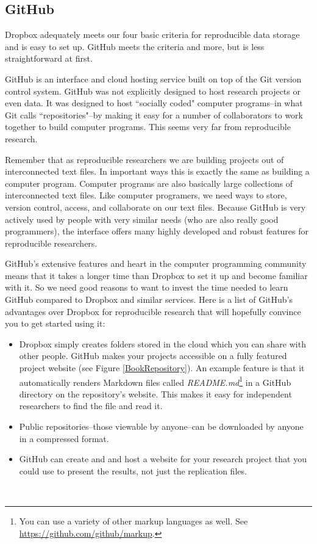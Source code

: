 \subsection{GitHub}

Dropbox adequately meets our four basic criteria for reproducible data storage and is easy to set up. GitHub meets the criteria and more, but is less straightforward at first.

GitHub is an interface and cloud hosting service built on top of the Git version control system. GitHub was not explicitly designed to host research projects or even data. It was designed to host ``socially coded" computer programs--in what Git calls ``repositories"--by making it easy for a number of collaborators to work together to build computer programs. This seems very far from reproducible research.

Remember that as reproducible researchers we are building projects out of interconnected text files. In important ways this is exactly the same as building a computer program. Computer programs are also basically large collections of interconnected text files. Like computer programers, we need ways to store, version control, access, and collaborate on our text files. Because GitHub is very actively used by people with very similar needs (who are also really good programmers), the interface offers many highly developed and robust features for reproducible researchers.

GitHub's extensive features and heart in the computer programming community means that it takes a longer time than Dropbox to set it up and become familiar with it. So we need good reasons to want to invest the time needed to learn GitHub compared to Dropbox and similar services. Here is a list of GitHub's advantages over Dropbox for reproducible research that will hopefully convince you to get started using it: \\[0.25cm]

\begin{itemize}
    \item Dropbox simply creates folders stored in the cloud which you can share with other people. GitHub makes your projects accessible on a fully featured project website (see Figure \ref{BookRepository}). An example feature is that it automatically renders Markdown files called {\emph{README.md}}\footnote{You can use a variety of other markup languages as well. See \url{https://github.com/github/markup}.} in a GitHub directory on the repository's website. This makes it easy for independent researchers to find the file and read it.   
    \item Public repositories--those viewable by anyone--can be downloaded by anyone in a compressed format.
    \item GitHub can create and and host a website for your research project that you could use to present the results, not just the replication files.
\end{itemize} \\[0.25cm]

